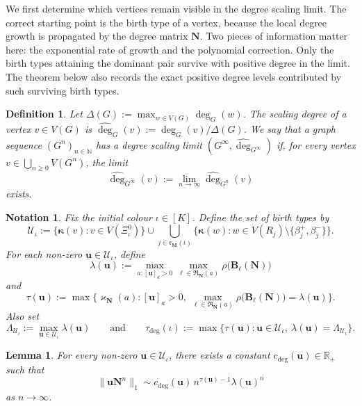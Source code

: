 \documentclass[12pt]{iopart}
\newtheorem{lemma}[theorem]{Lemma}
\newtheorem{definition}[theorem]{Definition}
\newtheorem{notation}[theorem]{Notation}
\newcommand*{\bkappa}{\boldsymbol{\kappa}}
\begin{document}
We first determine which vertices remain visible in the degree scaling limit.
The correct starting point is the birth type of a vertex, because the local degree growth is propagated by the degree matrix $\mathbf N$.
Two pieces of information matter here: the exponential rate of growth and the polynomial correction.
Only the birth types attaining the dominant pair survive with positive degree in the limit.
The theorem below also records the exact positive degree levels contributed by such surviving birth types.

\begin{definition}\label{def:degree-limit}
Let $\Delta(G):=\max_{w \in V(G)}\deg_G(w)$.
The {\em scaling degree} of a vertex $v\in V(G)$ is $\hat{\deg}_G(v):=\deg_G(v)/\Delta(G)$.
We say that a graph sequence $(G^n)_{n\in\mathbb N}$ has a {\em degree scaling limit} $(G^\infty,\hat{\deg}_{G^\infty})$ if, for every vertex $v\in \bigcup_{n\ge 0}V(G^n)$, the limit
\[
\hat{\deg}_{G^\infty}(v)
:=
\lim_{n\to\infty}\hat{\deg}_{G^n}(v)
\]
exists.
\end{definition}

\begin{notation}\label{not:degree-notation}
Fix the initial colour $\iota\in[K]$.
Define the set of birth types by
\[
\mathcal U_\iota
:=
\{\bkappa(v):v\in V(\Xi_\iota^0)\}
\cup
\bigcup_{j\in\mathfrak r_{\mathbf M}(\iota)}
\{\bkappa(w):w\in V(R_j)\setminus\{\beta_j^+,\beta_j^-\}\}.
\]
For each non-zero $\mathbf u\in\mathcal U_\iota$, define
\[
\lambda(\mathbf u)
:=
\max_{a:[\mathbf u]_a>0}
\max_{\ell\in\mathfrak R_{\mathbf N}(a)}
\rho\big(\mathbf B_\ell(\mathbf N)\big)
\]
and
\[
\tau(\mathbf u)
:=
\max\Big\{
\varkappa_{\mathbf N}(a):
[\mathbf u]_a>0,\
\max_{\ell\in\mathfrak R_{\mathbf N}(a)}
\rho\big(\mathbf B_\ell(\mathbf N)\big)
=
\lambda(\mathbf u)
\Big\}.
\]
Also set
\[
\Lambda_{\mathcal U_\iota}
:=
\max_{\mathbf u\in\mathcal U_\iota}\lambda(\mathbf u)
\qquad\text{and}\qquad
\tau_{\deg}(\iota)
:=
\max\big\{
\tau(\mathbf u):
\mathbf u\in\mathcal U_\iota,\
\lambda(\mathbf u)=\Lambda_{\mathcal U_\iota}
\big\}.
\]
\end{notation}

\begin{lemma}\label{lem:degree-row-asymp}
For every non-zero $\mathbf u\in\mathcal U_\iota$, there exists a constant $c_{\deg}(\mathbf u)\in\mathbb R_+$ such that
\[
\|\mathbf u\mathbf N^n\|_1
\sim
c_{\deg}(\mathbf u)\,
n^{\tau(\mathbf u)-1}\lambda(\mathbf u)^n
\]
as $n\to\infty$.
\end{lemma}
\end{document}
